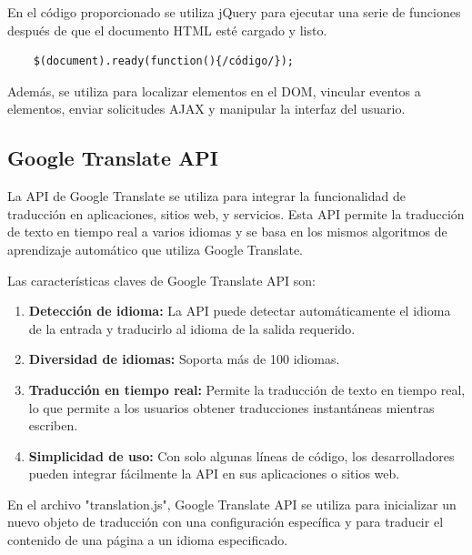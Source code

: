 \documentclass[a4paper, 12pt]{book}
\begin{document}
En el código proporcionado se utiliza jQuery para ejecutar una serie de funciones después de que el documento HTML esté cargado y listo. 

\begin{verbatim} 
    $(document).ready(function(){/código/});
\end{verbatim}

Además, se utiliza para localizar elementos en el DOM, vincular eventos a elementos, enviar solicitudes AJAX y manipular la interfaz del usuario.

\subsection{Google Translate API}
\label{subsec:google_translate_api}
La API de Google Translate se utiliza para integrar la funcionalidad de traducción en aplicaciones, sitios web, y servicios. Esta API permite la traducción de texto en tiempo 
real a varios idiomas y se basa en los mismos algoritmos de aprendizaje automático que utiliza Google Translate. 

Las características claves de Google Translate API son:

\begin{enumerate}
  \item \textbf{Detección de idioma:} La API puede detectar automáticamente el idioma de la entrada y traducirlo al idioma de la salida requerido.
  \item \textbf{Diversidad de idiomas:} Soporta más de 100 idiomas.
  \item \textbf{Traducción en tiempo real:} Permite la traducción de texto en tiempo real, lo que permite a los usuarios obtener traducciones instantáneas mientras escriben.
  \item \textbf{Simplicidad de uso:} Con solo algunas líneas de código, los desarrolladores pueden integrar fácilmente la API en sus aplicaciones o sitios web.
\end{enumerate}

En el archivo "translation.js", Google Translate API se utiliza para inicializar un nuevo objeto de traducción con una configuración específica y para traducir el contenido de una página a un idioma especificado.

\end{document}
